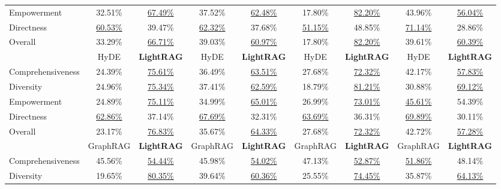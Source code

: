 \begin{table}[h]
{\begin{tabular}{@{}lcccccccc@{}}
Empowerment            & 32.51\%      & \underline{67.49\%}     & 37.52\%      & \underline{62.48\%}     & 17.80\%      & \underline{82.20\%}     & 43.96\%      & \underline{56.04\%}     \\
Directness             & \underline{60.53\%}      & 39.47\%     & \underline{62.32\%}      & 37.68\%     & \underline{51.15\%}      & 48.85\%     & \underline{71.14\%}      & 28.86\%     \\
Overall         & 33.29\%      & \underline{66.71\%}     & 39.03\%      & \underline{60.97\%}     & 17.80\%      & \underline{82.20\%}     & 39.61\%      & \underline{60.39\%}     \\
\cmidrule(lr){2-3} \cmidrule(lr){4-5} \cmidrule(lr){6-7} \cmidrule(lr){8-9}
                      & HyDE & \textbf{LightRAG} & HyDE & \textbf{LightRAG} & HyDE & \textbf{LightRAG} & HyDE & \textbf{LightRAG} \\
\midrule
Comprehensiveness      & 24.39\%      & \underline{75.61\%}     & 36.49\%      & \underline{63.51\%}     & 27.68\%      & \underline{72.32\%}     & 42.17\%      & \underline{57.83\%}     \\
Diversity              & 24.96\%      & \underline{75.34\%}     & 37.41\%      & \underline{62.59\%}     & 18.79\%      & \underline{81.21\%}     & 30.88\%      & \underline{69.12\%}     \\
Empowerment            & 24.89\%      & \underline{75.11\%}     & 34.99\%      & \underline{65.01\%}     & 26.99\%      & \underline{73.01\%}     & \underline{45.61\%}      & 54.39\%     \\
Directness             & \underline{62.86\%}      & 37.14\%     & \underline{67.69\%}      & 32.31\%     & \underline{63.69\%}      & 36.31\%     & \underline{69.89\%}      & 30.11\%     \\
Overall         & 23.17\%      & \underline{76.83\%}     & 35.67\%      & \underline{64.33\%}     & 27.68\%      & \underline{72.32\%}     & 42.72\%      & \underline{57.28\%}     \\
\cmidrule(lr){2-3} \cmidrule(lr){4-5} \cmidrule(lr){6-7} \cmidrule(lr){8-9}
                      & GraphRAG & \textbf{LightRAG} & GraphRAG & \textbf{LightRAG} & GraphRAG & \textbf{LightRAG} & GraphRAG & \textbf{LightRAG} \\
\midrule
Comprehensiveness      & 45.56\%      & \underline{54.44\%}     & 45.98\%      & \underline{54.02\%}     &  47.13\%     & \underline{52.87\%}     & \underline{51.86\%}      & 48.14\%     \\
Diversity              & 19.65\%      & \underline{80.35\%}     & 39.64\%      & \underline{60.36\%}     &  25.55\%     & \underline{74.45\%}     & 35.87\%      & \underline{64.13\%}     \\

\end{tabular}}
\end{table}
